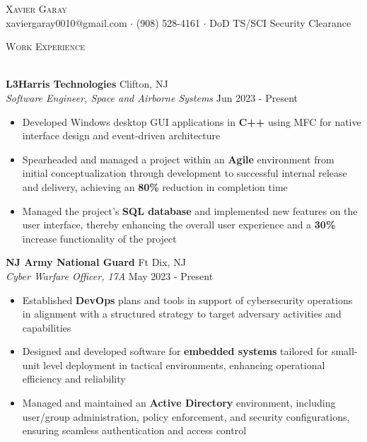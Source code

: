 \documentclass[a4paper]{article}
\newcommand{\lineunder} {
        \vspace*{-8pt} \\
        \hspace*{-18pt} \hrulefill \\
    }
\newcommand{\header} [1] {
        {\hspace*{-18pt}\vspace*{6pt} \textsc{#1}}
        \vspace*{-6pt} \lineunder
    }
\begin{document}
    \vspace*{-40pt}
    
    \vspace*{-10pt}
    \begin{center}
        {\Huge \scshape {Xavier Garay}}\\
        xaviergaray0010@gmail.com $\cdot$ (908) 528-4161 $\cdot$ DoD TS/SCI Security Clearance\\
    \end{center}
    
    \header{Work Experience}
    \vspace{1mm}
    
                \textbf{L3Harris Technologies} \hfill Clifton, NJ\\
                \textit{Software Engineer, Space and Airborne Systems} \hfill Jun 2023 - Present\\
                \vspace{-1mm}
                \begin{itemize} \itemsep 1pt
                
                \item Developed Windows desktop GUI applications in \textbf{C++} using MFC for native interface design and event-driven architecture
                \item Spearheaded and managed a project within an \textbf{Agile} environment from initial conceptualization through development to successful internal release and delivery, achieving an \textbf{80\%} reduction in completion time
                \item Managed the project’s \textbf{SQL database} and implemented new features on the user interface, thereby enhancing the overall user experience and a \textbf{30\%} increase functionality of the project\end{itemize}
                \textbf{NJ Army National Guard} \hfill Ft Dix, NJ\\
                \textit{Cyber Warfare Officer, 17A} \hfill May 2023 - Present\\
                \vspace{-1mm}
                \begin{itemize} \itemsep 1pt
                
                \item Established \textbf{DevOps} plans and tools in support of cybersecurity operations in alignment with a structured strategy to target adversary activities and capabilities
                \item Designed and developed software for \textbf{embedded systems} tailored for small-unit level deployment in tactical environments, enhancing operational efficiency and reliability
                \item Managed and maintained an \textbf{Active Directory} environment, including user/group administration, policy enforcement, and security configurations, ensuring seamless authentication and access control\end{itemize}
\end{document}
